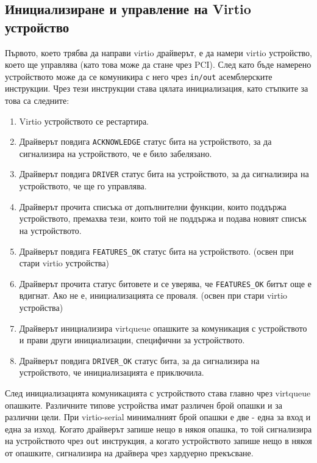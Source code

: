   \subsection{Инициализиране и управление на Virtio устройство} \label{virtioinit}
  Първото, което трябва да направи virtio драйверът, е да намери virtio устройство, което ще управлява (като това може да стане чрез PCI). След като бъде намерено устройството може да се комуникира с него чрез {\tt in/out} асемблерските инструкции. Чрез тези инструкции става цялата инициализация, като стъпките за това са следните:\cite[глава~3.1.1]{virtiodocs}
  \begin{enumerate}
    \item Virtio устройството се рестартира.
    \item Драйверът повдига {\tt ACKNOWLEDGE} статус бита на устройството, за да сигнализира на устройството, че е било забелязано.
    \item Драйверът повдига {\tt DRIVER} статус бита на устройството, за да сигнализира на устройството, че ще го управлява.
    \item Драйверът прочита списъка от допълнителни функции, които поддържа устройството, премахва тези, които той не поддържа и подава новият списък на устройството.
    \item Драйверът повдига {\tt FEATURES\_OK} статус бита на устройството. (освен при стари virtio устройства)
    \item Драйверът прочита статус битовете и се уверява, че {\tt FEATURES\_OK} битът още е вдигнат. Ако не е, инициализацията се проваля. (освен при стари virtio устройства)
    \item Драйверът инициализира virtqueue опашките за комуникация с устройството и прави други инициализации, специфични за устройството.
    \item Драйверът повдига {\tt DRIVER\_OK} статус бита, за да сигнализира на устройството, че инициализацията е приключила.
  \end{enumerate}

  След инициализацията комуникацията с устройството става главно чрез virtqueue опашките. Различните типове устройства имат различен брой опашки и за различни цели. При virtio-serial минималният брой опашки е две - една за вход и една за изход.\cite[глава~5.3]{virtiodocs} Когато драйверът запише нещо в някоя опашка, то той сигнализира на устройството чрез {\tt out} инструкция, а когато устройството запише нещо в някоя от опашките, сигнализира на драйвера чрез хардуерно прекъсване.

